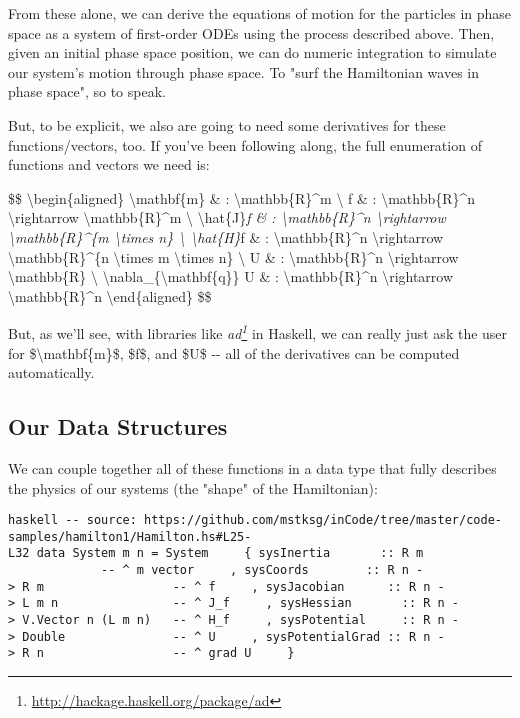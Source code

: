 \documentclass[]{article}
\renewcommand{\href}[2]{#2\footnote{\url{#1}}}
\begin{document}
From these alone, we can derive the equations of motion for the particles in
phase space as a system of first-order ODEs using the process described above.
Then, given an initial phase space position, we can do numeric integration to
simulate our system's motion through phase space. To "surf the Hamiltonian waves
in phase space", so to speak.

But, to be explicit, we also are going to need some derivatives for these
functions/vectors, too. If you've been following along, the full enumeration of
functions and vectors we need is:

\$\$ \textbackslash{}begin\{aligned\} \textbackslash{}mathbf\{m\} \& :
\textbackslash{}mathbb\{R\}\^{}m \textbackslash{} f \& :
\textbackslash{}mathbb\{R\}\^{}n \textbackslash{}rightarrow
\textbackslash{}mathbb\{R\}\^{}m \textbackslash{}
\textbackslash{}hat\{J\}\emph{f \& : \textbackslash{}mathbb\{R\}\^{}n
\textbackslash{}rightarrow \textbackslash{}mathbb\{R\}\^{}\{m
\textbackslash{}times n\} \textbackslash{} \textbackslash{}hat\{H\}}f \& :
\textbackslash{}mathbb\{R\}\^{}n \textbackslash{}rightarrow
\textbackslash{}mathbb\{R\}\^{}\{n \textbackslash{}times m \textbackslash{}times
n\} \textbackslash{} U \& : \textbackslash{}mathbb\{R\}\^{}n
\textbackslash{}rightarrow \textbackslash{}mathbb\{R\} \textbackslash{}
\textbackslash{}nabla\_\{\textbackslash{}mathbf\{q\}\} U \& :
\textbackslash{}mathbb\{R\}\^{}n \textbackslash{}rightarrow
\textbackslash{}mathbb\{R\}\^{}n \textbackslash{}end\{aligned\} \$\$

But, as we'll see, with libraries like
\emph{\href{http://hackage.haskell.org/package/ad}{ad}} in Haskell, we can
really just ask the user for \$\textbackslash{}mathbf\{m\}\$, \$f\$, and \$U\$
-\/- all of the derivatives can be computed automatically.

\subsection{Our Data Structures}

We can couple together all of these functions in a data type that fully
describes the physics of our systems (the "shape" of the Hamiltonian):

\texttt{haskell\ -\/-\ source:\ https://github.com/mstksg/inCode/tree/master/code-samples/hamilton1/Hamilton.hs\#L25-L32\ data\ System\ m\ n\ =\ System\ \ \ \ \ \{\ sysInertia\ \ \ \ \ \ \ ::\ R\ m\ \ \ \ \ \ \ \ \ \ \ \ \ \ \ \ \ \ \ \ \ \ \ \ \ -\/-\ \^{}\ \textquotesingle{}m\textquotesingle{}\ vector\ \ \ \ \ ,\ sysCoords\ \ \ \ \ \ \ \ ::\ R\ n\ -\textgreater{}\ R\ m\ \ \ \ \ \ \ \ \ \ \ \ \ \ \ \ \ \ -\/-\ \^{}\ f\ \ \ \ \ ,\ sysJacobian\ \ \ \ \ \ ::\ R\ n\ -\textgreater{}\ L\ m\ n\ \ \ \ \ \ \ \ \ \ \ \ \ \ \ \ -\/-\ \^{}\ J\_f\ \ \ \ \ ,\ sysHessian\ \ \ \ \ \ \ ::\ R\ n\ -\textgreater{}\ V.Vector\ n\ (L\ m\ n)\ \ \ -\/-\ \^{}\ H\_f\ \ \ \ \ ,\ sysPotential\ \ \ \ \ ::\ R\ n\ -\textgreater{}\ Double\ \ \ \ \ \ \ \ \ \ \ \ \ \ \ -\/-\ \^{}\ U\ \ \ \ \ ,\ sysPotentialGrad\ ::\ R\ n\ -\textgreater{}\ R\ n\ \ \ \ \ \ \ \ \ \ \ \ \ \ \ \ \ \ -\/-\ \^{}\ grad\ U\ \ \ \ \ \}}
\end{document}
